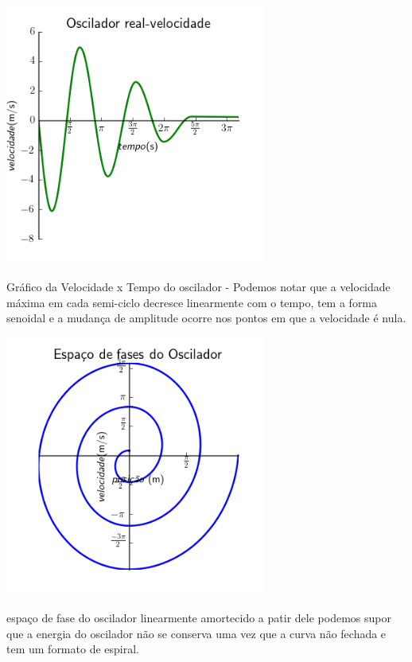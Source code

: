 \documentclass[a4paper]{article} %
\begin{document}
\begin{center}
	
	\includegraphics[width=3.38in,height=3.38in,keepaspectratio = false]{image1_2.png}
	
	\scriptsize Gr\'afico da Velocidade x Tempo do oscilador - Podemos notar que a velocidade m\'axima em cada semi-ciclo decresce linearmente com o tempo, tem a forma senoidal e a mudan\c{c}a de amplitude ocorre nos pontos em que a velocidade \'e nula.
\end{center}
 
\begin{center}
	
	\includegraphics[width=3.38in,height=3.38in,keepaspectratio = false]{image1_3.png}
	
	\scriptsize espa\c{c}o de fase do oscilador linearmente amortecido a patir dele podemos supor que a energia do oscilador n\~ao se conserva uma vez que a curva n\~ao fechada e tem um formato de espiral.
\end{center}
\end{document}
